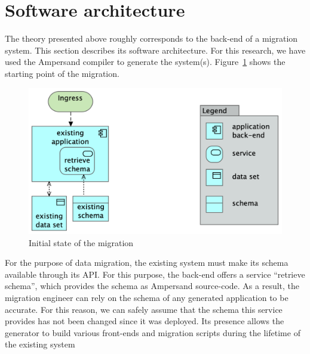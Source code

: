 \documentclass{elsarticle}
\begin{document}
\section{Software architecture}
   The theory presented above roughly corresponds to the back-end of a migration system.
   This section describes its software architecture.
   For this research, we have used the Ampersand compiler to generate the system(s).
   Figure~\ref{fig:initial} shows the starting point of the migration.
\begin{figure}
   \centering
   \includegraphics[scale=0.1]{figures/Before migration.png}
   \caption{Initial state of the migration}
   \label{fig:initial}
\end{figure}
   For the purpose of data migration, the existing system must make its schema available through its API.
   For this purpose, the back-end offers a service ``retrieve schema'', which provides the schema as Ampersand source-code.
   As a result, the migration engineer can rely on the schema of any generated application to be accurate.
   For this reason, we can safely assume that the schema this service provides has not been changed since it was deployed.
   Its presence allows the generator to build various front-ends and migration scripts during the lifetime of the existing system%
\end{document}
